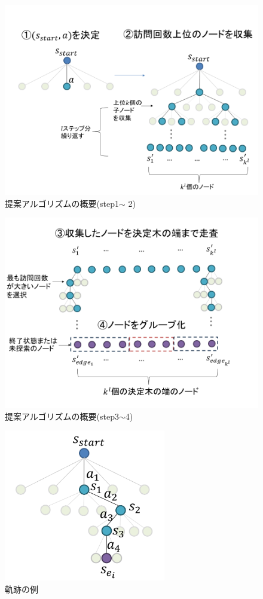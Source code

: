 \begin{enumerate}
\end{enumerate}


\begin{figure}[htbp]
    \centering
    \includegraphics[width=\linewidth]{./figure/1-2.png}
    \caption{提案アルゴリズムの概要(step1$\sim$ 2)}
    \label{fig:step1-2}
\end{figure}
\begin{figure}[htbp]
    \centering
    \includegraphics[width=\linewidth]{./figure/3-4.png}
    \caption{提案アルゴリズムの概要(step3$\sim $4)}
    \label{fig:step3-4}
\end{figure}
\begin{figure}[htbp]
    \centering
    \includegraphics[width=200pt]{./figure/traj-example.png}
    \caption{軌跡の例}
    \label{fig:traj-example}
\end{figure}
